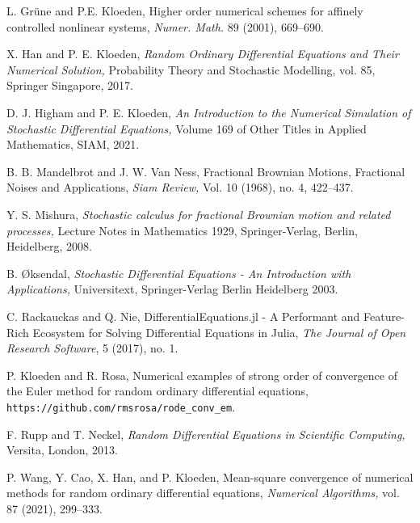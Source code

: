 \documentclass[reqno,12pt]{amsart}
\theoremstyle{plain}%
\theoremstyle{definition}
\begin{document}
\begin{thebibliography}{25}
     L. Gr\"une and P.E. Kloeden, Higher order numerical schemes for affinely controlled nonlinear systems, \emph{Numer. Math.} 89 (2001), 669--690.

     X. Han and P. E. Kloeden, \emph{Random Ordinary Differential Equations and Their Numerical Solution,} Probability Theory and Stochastic Modelling, vol. 85, Springer Singapore, 2017.

     D. J. Higham and P. E. Kloeden, \emph{An Introduction to the Numerical Simulation of Stochastic Differential Equations,} Volume 169 of Other Titles in Applied Mathematics, SIAM, 2021.

     B. B. Mandelbrot and J. W. Van Ness, Fractional Brownian Motions, Fractional Noises and Applications, \emph{Siam Review,} Vol. 10 (1968), no. 4, 422--437.

     Y. S. Mishura, \emph{Stochastic calculus for fractional Brownian motion and related processes,} Lecture Notes in Mathematics 1929, Springer-Verlag, Berlin, Heidelberg, 2008.

     B. {\O}ksendal, \emph{Stochastic Differential Equations - An Introduction with Applications,} Universitext, Springer-Verlag Berlin Heidelberg 2003.

     C. Rackauckas and Q. Nie, DifferentialEquations.jl - A Performant and Feature-Rich Ecosystem for Solving Differential Equations in Julia, \emph{The Journal of Open Research Software}, 5 (2017), no. 1.

     P. Kloeden and R. Rosa, Numerical examples of strong order of convergence of the Euler method for random ordinary differential equations, \texttt{https://github.com/rmsrosa/rode\_conv\_em}.

     F. Rupp and T. Neckel, \emph{Random Differential Equations in Scientific Computing,} Versita, London, 2013.

     P. Wang, Y. Cao, X. Han, and P. Kloeden, Mean-square convergence of numerical methods for random ordinary differential equations, \emph{Numerical Algorithms,} vol. 87 (2021), 299--333.

\end{thebibliography}
\end{document}
